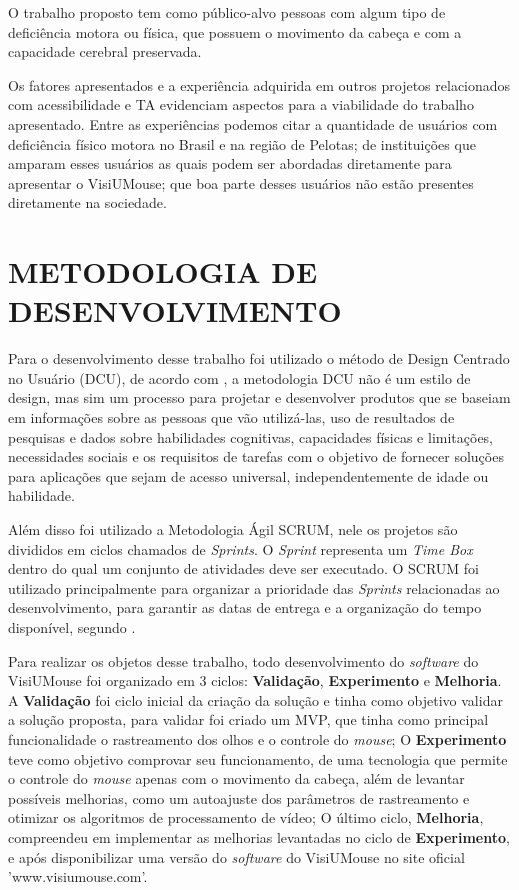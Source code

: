 O trabalho proposto tem como público-alvo pessoas com algum tipo de deficiência motora ou física, que possuem o movimento da cabeça e com a capacidade cerebral preservada.

Os fatores apresentados e a experiência adquirida em outros projetos relacionados com acessibilidade e TA evidenciam aspectos para a viabilidade do trabalho apresentado. Entre as experiências podemos citar a quantidade de usuários com deficiência físico motora no Brasil e na região de Pelotas; de instituições que amparam esses usuários as quais podem ser abordadas diretamente para apresentar o VisiUMouse; que boa parte desses usuários não estão presentes diretamente na sociedade.

\section{METODOLOGIA DE DESENVOLVIMENTO}\label{Sub:metodologia-desenvolvimento}
Para o desenvolvimento desse trabalho foi utilizado o método de Design Centrado no Usuário (DCU), de acordo com \cite{GREENHOUSE2010}, a metodologia DCU não é um estilo de design, mas sim um processo para projetar e desenvolver produtos que se baseiam em informações sobre as pessoas que vão utilizá-las, uso de resultados de pesquisas e dados sobre habilidades cognitivas, capacidades físicas e limitações, necessidades sociais e os requisitos de tarefas com o objetivo de fornecer soluções para aplicações que sejam de acesso universal, independentemente de idade ou habilidade. 

Além disso foi utilizado a Metodologia Ágil SCRUM, nele os projetos são divididos em ciclos chamados de \textit{Sprints}. O \textit{Sprint} representa um \textit{Time Box} dentro do qual um conjunto de atividades deve ser executado. O SCRUM foi utilizado principalmente para organizar a prioridade das \textit{Sprints} relacionadas ao desenvolvimento, para garantir as datas de entrega e a organização do tempo disponível, segundo .

Para realizar os objetos desse trabalho, todo desenvolvimento do \textit{software} do VisiUMouse foi organizado em 3 ciclos: \textbf{Validação}, \textbf{Experimento} e \textbf{Melhoria}. A \textbf{Validação} foi ciclo inicial da criação da solução e tinha como objetivo validar a solução proposta, para validar foi criado um MVP, que tinha como principal funcionalidade o rastreamento dos olhos e o controle do \textit{mouse}; O \textbf{Experimento} teve como objetivo comprovar seu funcionamento, de uma tecnologia que permite o controle do \textit{mouse} apenas com o movimento da cabeça, além de levantar possíveis melhorias, como um autoajuste dos parâmetros de rastreamento e otimizar os algoritmos de processamento de vídeo; O último ciclo, \textbf{Melhoria},  compreendeu em implementar as melhorias levantadas no ciclo de \textbf{Experimento}, e após disponibilizar uma versão do \textit{software} do VisiUMouse no site oficial 'www.visiumouse.com'.

